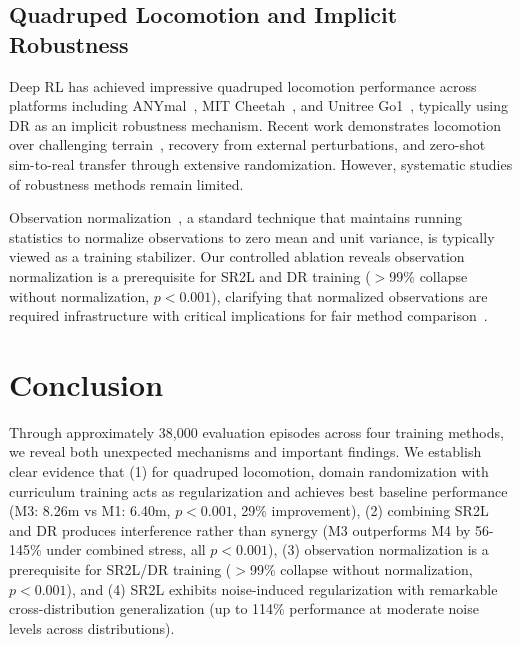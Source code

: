 \documentclass[conference]{IEEEtran}
\begin{document}
\subsection{Quadruped Locomotion and Implicit Robustness}

Deep RL has achieved impressive quadruped locomotion performance across platforms including ANYmal~\cite{hwangbo2019learning}, MIT Cheetah~\cite{lee2020learning}, and Unitree Go1~\cite{miki2022learning}, typically using DR as an implicit robustness mechanism. Recent work demonstrates locomotion over challenging terrain~\cite{kumar2021rma}, recovery from external perturbations, and zero-shot sim-to-real transfer through extensive randomization. However, systematic studies of robustness methods remain limited.

Observation normalization~\cite{openai2018baselines}, a standard technique that maintains running statistics to normalize observations to zero mean and unit variance, is typically viewed as a training stabilizer. Our controlled ablation reveals observation normalization is a prerequisite for SR2L and DR training ($>$99\% collapse without normalization, $p<0.001$), clarifying that normalized observations are required infrastructure with critical implications for fair method comparison~\cite{andrychowicz2021matters}.

\section{Conclusion}

Through approximately 38,000 evaluation episodes across four training methods, we reveal both unexpected mechanisms and important findings. We establish clear evidence that (1) for quadruped locomotion, domain randomization with curriculum training acts as regularization and achieves best baseline performance (M3: 8.26m vs M1: 6.40m, $p<0.001$, 29\% improvement), (2) combining SR2L and DR produces interference rather than synergy (M3 outperforms M4 by 56-145\% under combined stress, all $p<0.001$), (3) observation normalization is a prerequisite for SR2L/DR training ($>$99\% collapse without normalization, $p<0.001$), and (4) SR2L exhibits noise-induced regularization with remarkable cross-distribution generalization (up to 114\% performance at moderate noise levels across distributions).
\end{document}
